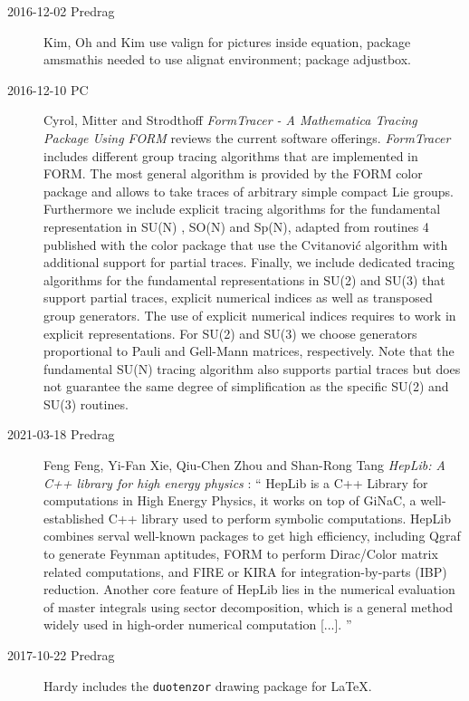 \begin{description}

\item[2016-12-02 Predrag]
Kim, Oh and Kim use valign for pictures inside equation,
package {amsmath}is needed to use alignat environment;
package {adjustbox}.

\item[2016-12-10 PC]
Cyrol, Mitter and Strodthoff
{\em {FormTracer - A Mathematica Tracing Package Using FORM}}
reviews the current software offerings.
\emph{FormTracer} includes different group tracing algorithms that are
implemented in FORM. The most general algorithm is
provided by the FORM color package and allows to take traces of
arbitrary simple compact Lie groups. Furthermore we include explicit tracing
algorithms for the fundamental representation in SU(N) , SO(N) and Sp(N),
adapted from routines 4 published with the color package that
use the Cvitanovi{\'c} algorithm with additional support for partial
traces. Finally, we include dedicated tracing algorithms for the fundamental
representations in SU(2) and SU(3) that support partial traces, explicit
numerical indices as well as transposed group generators. The use of explicit
numerical indices requires to work in explicit representations.  For SU(2)
and SU(3) we choose generators proportional to Pauli and Gell-Mann matrices,
respectively. Note that the fundamental SU(N) tracing algorithm also supports
partial traces but does not guarantee the same degree of simplification as
the specific SU(2) and SU(3) routines.

\item[2021-03-18 Predrag]
Feng Feng, Yi-Fan Xie, Qiu-Chen Zhou and Shan-Rong Tang
{\em {HepLib: A C++} library for high energy physics}
: ``
HepLib is a C++ Library for computations in High Energy Physics, it works
on top of GiNaC, a well-established C++ library used to perform symbolic
computations. HepLib combines serval well-known packages to get high
efficiency, including Qgraf to generate Feynman aptitudes, FORM to
perform Dirac/Color matrix related computations, and FIRE or KIRA for
integration-by-parts (IBP) reduction. Another core feature of HepLib lies
in the numerical evaluation of master integrals using sector
decomposition, which is a general method widely used in high-order
numerical computation [...].
''

\item[2017-10-22 Predrag]
Hardy  includes the \texttt{duotenzor} drawing package for LaTeX.


\end{description}
